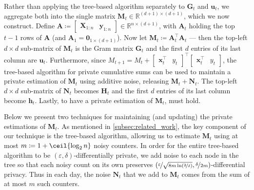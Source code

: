 \documentclass{article}
\renewcommand{\vec}[1]{\bm{#1}}
\newcommand{\defeq}{\coloneq}
\newcommand{\Real}{\mathds{R}}
\DeclarePairedDelimiter{\ceil}\lceil\rceil
\providecommand\transp{\top}
\let\transpsymbol\transp
\renewcommand{\transp}[1]{#1^\transpsymbol}
\newcommand{\XtX}[1]{\transp{#1}{#1}}
\begin{document}
Rather than applying the tree-based algorithm separately to $\vec G_t$
and $\vec u_t$, we aggregate both into the single matrix
$\vec M_t\in\Real^{(d+1)\times(d+1)}$, which we now construct.  Define
$\vec A \defeq \begin{bmatrix} \vec X_{1:n} & \vec
  y_{1:n} \end{bmatrix} \in \Real^{n\times(d+1)}$, with $\vec A_t$
holding the top $t-1$ rows of $\vec A$ (and
$\vec A_1 = \vec 0_{1\times(d+1)}$).  Now let
$\vec M_t \defeq \XtX{\vec A_t}$ --- then the top-left $d\times d$
sub-matrix of $\vec M_t$ is the Gram matrix $\vec G_t$ and the first
$d$ entries of its last column are $\vec u_t$.  Furthermore, since
$M_{t+1} = M_t + \XtX{\begin{bmatrix}\transp{\vec x_t} &
    y_t \end{bmatrix}}$, the tree-based algorithm for private
cumulative sums can be used to maintain a private estimation of
$\vec M_t$ using additive noise, releasing $\vec M_t + \vec N_t$.  The
top-left $d\times d$ sub-matrix of $\vec N_t$ becomes $\vec H_t$ and
the first $d$ entries of its last column become $\vec h_t$. Lastly, to
have a private estimation of $\vec M_t$,  must
hold.

Below we present two techniques for maintaining (and updating) the
private estimations of $\vec M_t$. As mentioned in
\cref{subsec:related_work}, the key component of our technique is
the tree-based algorithm, allowing us to estimate $\vec M_t$ using at most
$m \defeq 1 + \ceil{\log_2n}$ noisy counters. In order for the entire
tree-based algorithm to be $(\varepsilon,\delta)$-differentially
private, we add noise to each node in the tree so that each noisy
count on its own preserves
$(\nicefrac{\varepsilon}{\sqrt{8m\ln(\nicefrac{2}{\delta})}},
\nicefrac{\delta}{2m})$-differential privacy. Thus in each day, the
noise $\vec N_t$ that we add to $\vec M_t$ comes from the sum of at most $m$
such counters.


\end{document}
